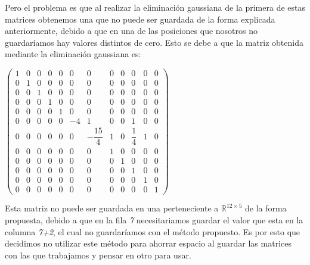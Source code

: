 \documentclass[10pt, a4paper]{article}
\begin{document}
Pero el problema es que al realizar la eliminaci\'on gaussiana de la primera de estas matrices obtenemos una que no puede ser guardada de la forma explicada anteriormente, debido a que en una de las posiciones que nosotros no guardar\'iamos hay valores distintos de cero. Esto se debe a que la matriz obtenida mediante la eliminaci\'on gaussiana es:

\begin{center}
$\begin{pmatrix}
1 & 0 & 0 & 0 & 0 &  0 &  0 & 0 & 0 & 0 & 0 & 0 \\
0 & 1 & 0 & 0 & 0 &  0 &  0 & 0 & 0 & 0 & 0 & 0 \\
0 & 0 & 1 & 0 & 0 &  0 &  0 & 0 & 0 & 0 & 0 & 0 \\
0 & 0 & 0 & 1 & 0 &  0 &  0 & 0 & 0 & 0 & 0 & 0 \\
0 & 0 & 0 & 0 & 1 &  0 &  0 & 0 & 0 & 0 & 0 & 0 \\
0 & 0 & 0 & 0 & 0 & -4 &  1 & 0 & 0 & 1 & 0 & 0 \\
0 & 0 & 0 & 0 & 0 &  0 & -\dfrac{15}{4} & 1 & 0 & \dfrac{1}{4} & 1 & 0 \\
0 & 0 & 0 & 0 & 0 &  0 &  0 & 1 & 0 & 0 & 0 & 0 \\
0 & 0 & 0 & 0 & 0 &  0 &  0 & 0 & 1 & 0 & 0 & 0 \\
0 & 0 & 0 & 0 & 0 &  0 &  0 & 0 & 0 & 1 & 0 & 0 \\
0 & 0 & 0 & 0 & 0 &  0 &  0 & 0 & 0 & 0 & 1 & 0 \\
0 & 0 & 0 & 0 & 0 &  0 &  0 & 0 & 0 & 0 & 0 & 1
\end{pmatrix}$
\end{center}

Esta matriz no puede ser guardada en una perteneciente a $\mathbb{R}^{12\times5}$ de la forma propuesta, debido a que en la fila \textit{7} necesitariamos guardar el valor que esta en la columna \textit{7+2}, el cual no guardar\'iamos con el m\'etodo propuesto. Es por esto que decidimos no utilizar este m\'etodo para ahorrar espacio al guardar las matrices con las que trabajamos y pensar en otro para usar.
\end{document}
